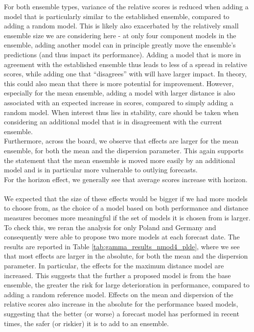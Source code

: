 For both ensemble types, variance of the relative scores is reduced when adding a model that is particularly similar to the established ensemble, compared to adding a random model. This is likely also exacerbated by the relatively small ensemble size we are considering here - at only four component models in the ensemble, adding another model can in principle greatly move the ensemble's predictions (and thus impact its performance). Adding a model that is more in agreement with the established ensemble thus leads to less of a spread in relative scores, while adding one that ``disagrees'' with will have larger impact. In theory, this could also mean that there is more potential for improvement. However, especially for the mean ensemble, adding a model with larger distance is also associated with an expected increase in scores, compared to simply adding a random model. When interest thus lies in stability, care should be taken when considering an additional model that is in disagreement with the current ensemble.\\
Furthermore, across the board, we observe that effects are larger for the mean ensemble, for both the mean and the dispersion parameter. This again supports the statement that the mean ensemble is moved more easily by an additional model and is in particular more vulnerable to outlying forecasts. \\
For the horizon effect, we generally see that average scores increase with horizon.\\
\\
We expected that the size of these effects would be bigger if we had more models to choose from, as the choice of a model based on both performance and distance measures becomes more meaningful if the set of models it is chosen from is larger. To check this, we reran the analysis for only Poland and Germany and consequently were able to propose two more models at each forecast date. The results are reported in Table \ref{tab:gamma_results_nmod4_plde}, where we see that most effects are larger in the absolute, for both the mean and the dispersion parameter. In particular, the effects for the maximum distance model are increased. This suggests that the further a proposed model is from the base ensemble, the greater the risk for large deterioration in performance, compared to adding a random reference model. Effects on the mean and dispersion of the relative scores also increase in the absolute for the performance based models, suggesting that the better (or worse) a forecast model has performed in recent times, the safer (or riskier) it is to add to an ensemble.\\
